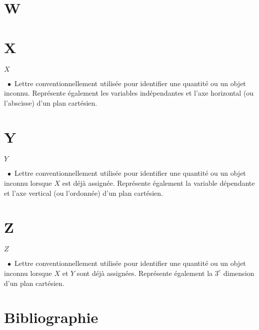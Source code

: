 \documentclass[10.5pt,a4paper]{article}
\renewcommand{\footnotesize}{\scriptsize}
\newcommand{\entry}[3]{\normalsize{\textbf{#1}}\markboth{#1}{#1}\ $\bullet$\ \footnotesize{#2}\ \footnotesize{#3}} %
\begin{document}
\begin{multicols}{2}
\section*{W}

\section*{X}

\entry{$X$}{Lettre conventionnellement utilisée pour identifier une quantité ou un objet inconnu. Représente également les variables indépendantes et l'axe horizontal (ou l'abscisse) d'un plan cartésien.}{}

\section*{Y}

\entry{$Y$}{Lettre conventionnellement utilisée pour identifier une quantité ou un objet inconnu lorsque $X$ est déjà assignée. Représente également la variable dépendante et l'axe vertical (ou l'ordonnée) d'un plan cartésien.}{}

\section*{Z}

\entry{$Z$}{Lettre conventionnellement utilisée pour identifier une quantité ou un objet inconnu lorsque $X$ et $Y$ sont déjà assignées. Représente également la $3^{e}$ dimension d'un plan cartésien.}{}

\end{multicols}

\pagebreak

\section{Bibliographie}
\begingroup
\renewcommand{\section}[2]{}


\vspace{10cm}
\endgroup
\end{document}
